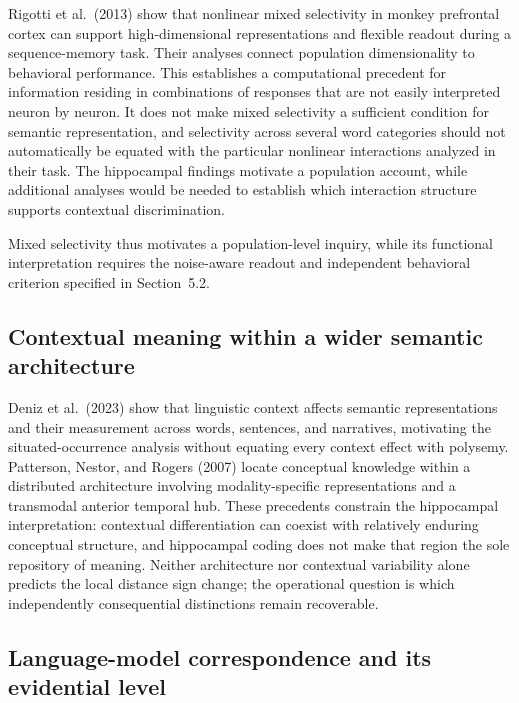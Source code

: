 \documentclass[11pt]{article}
\begin{document}
Rigotti et al.~(2013) show that nonlinear mixed selectivity in monkey
prefrontal cortex can support high-dimensional representations and
flexible readout during a sequence-memory task. Their analyses connect
population dimensionality to behavioral performance. This establishes a
computational precedent for information residing in combinations of
responses that are not easily interpreted neuron by neuron. It does not
make mixed selectivity a sufficient condition for semantic
representation, and selectivity across several word categories should
not automatically be equated with the particular nonlinear interactions
analyzed in their task. The hippocampal findings motivate a population
account, while additional analyses would be needed to establish which
interaction structure supports contextual discrimination.

Mixed selectivity thus motivates a population-level inquiry, while its
functional interpretation requires the noise-aware readout and
independent behavioral criterion specified in Section~5.2.

\hypertarget{contextual-meaning-within-a-wider-semantic-architecture}{%
\subsection{Contextual meaning within a wider semantic
architecture}\label{contextual-meaning-within-a-wider-semantic-architecture}}

Deniz et al.~(2023) show that linguistic context affects semantic
representations and their measurement across words, sentences, and
narratives, motivating the situated-occurrence analysis without equating
every context effect with polysemy. Patterson, Nestor, and Rogers (2007)
locate conceptual knowledge within a distributed architecture involving
modality-specific representations and a transmodal anterior temporal
hub. These precedents constrain the hippocampal interpretation:
contextual differentiation can coexist with relatively enduring
conceptual structure, and hippocampal coding does not make that region
the sole repository of meaning. Neither architecture nor contextual
variability alone predicts the local distance sign change; the
operational question is which independently consequential distinctions
remain recoverable.

\hypertarget{language-model-correspondence-and-its-evidential-level}{%
\subsection{Language-model correspondence and its evidential
level}\label{language-model-correspondence-and-its-evidential-level}}
\end{document}
